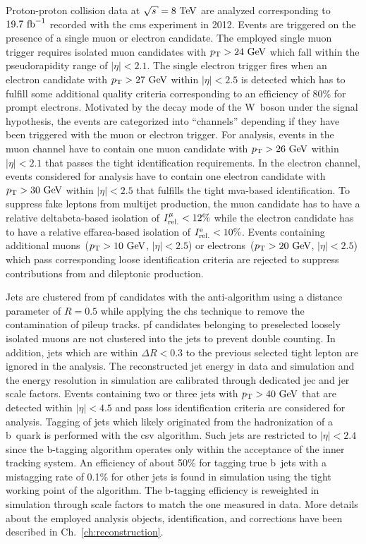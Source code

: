 Proton-proton collision data at $\sqrt{s}=8~\TeV$ are analyzed corresponding to $19.7~\mathrm{fb}^{-1}$ recorded with the \gls{cms} experiment in 2012. Events are triggered on the presence of a single muon or electron candidate. The employed single muon trigger requires isolated muon candidates with $p_\mathrm{T}>24~\mathrm{GeV}$ which fall within the pseudorapidity range of $|\eta|<2.1$. The single electron trigger fires when an electron candidate with $p_\mathrm{T}>27~\mathrm{GeV}$ within $|\eta|<2.5$ is detected which has to fulfill some additional quality criteria corresponding to an efficiency of 80\% for prompt electrons. Motivated by the decay mode of the W~boson under the signal hypothesis, the events are categorized into ``channels'' depending if they have been triggered with the muon or electron trigger. For analysis, events in the muon channel have to contain one muon candidate with $p_\mathrm{T}>26~\mathrm{GeV}$ within $|\eta|<2.1$ that passes the tight identification requirements. In the electron channel, events considered for analysis have to contain one electron candidate with $p_\mathrm{T}>30~\mathrm{GeV}$ within $|\eta|<2.5$ that fulfills the tight \gls{mva}-based  identification. To suppress fake leptons from multijet production, the muon candidate has to have a relative \gls{deltabeta}-based isolation of $I_\mathrm{rel.}^{\mu}<12\%$ while the electron candidate has to have a relative \gls{effarea}-based isolation of $I_\mathrm{rel.}^\mathrm{e}<10\%$. Events containing additional muons~($p_\mathrm{T}>10~\mathrm{GeV}$, $|\eta|<2.5$) or electrons~($p_\mathrm{T}>20~\mathrm{GeV}$, $|\eta|<2.5$) which pass corresponding loose identification criteria are rejected to suppress contributions from \zjets and dileptonic \ttbar production. 

Jets are clustered from \gls{pf} candidates with the anti-\kt algorithm using a distance parameter of $R=0.5$ while applying the \gls{chs} technique to remove the contamination of pileup tracks. \gls{pf} candidates belonging to preselected loosely isolated muons are not clustered into the jets to prevent double counting. In addition, jets which are within $\Delta R<0.3$ to the previous selected tight lepton are ignored in the analysis. The reconstructed jet energy in data and simulation and the energy resolution in simulation are calibrated through dedicated \gls{jec} and \gls{jer} scale factors. Events containing two or three jets with $p_\mathrm{T}>40~\mathrm{GeV}$ that are detected within $|\eta|<4.5$ and pass loss identification criteria are considered for analysis. Tagging of jets which likely originated from the hadronization of a b~quark is performed with the \gls{csv} algorithm. Such jets are restricted to $|\eta|<2.4$ since the b-tagging algorithm operates only within the acceptance of the inner tracking system. An efficiency of about 50\% for tagging true b~jets with a mistagging rate of 0.1\% for other jets is found in simulation using the tight working point of the algorithm. The b-tagging efficiency is reweighted in simulation through scale factors to match the one measured in data. More details about the employed analysis objects, identification, and corrections have been described in Ch.~\ref{ch:reconstruction}.

